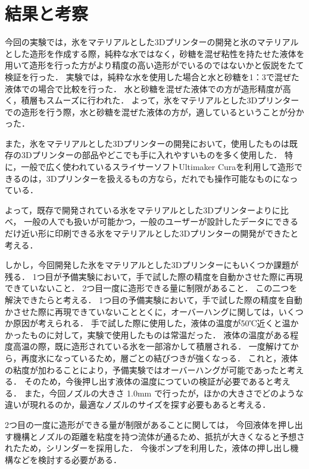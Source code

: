 \chapter{結果と考察}
\label{chp:first}

今回の実験では，氷をマテリアルとした3Dプリンターの開発と氷のマテリアルとした造形を作成する際，純粋な水ではなく，砂糖を混ぜ粘性を持たせた液体を用いて造形を行った方がより精度の高い造形がでいるのではないかと仮説をたて検証を行った．
実験では，純粋な水を使用した場合と水と砂糖を1：3で混ぜた液体での場合で比較を行った．
水と砂糖を混ぜた液体での方が造形精度が高く，積層もスムーズに行われた．
よって，氷をマテリアルとした3Dプリンターでの造形を行う際，水と砂糖を混ぜた液体の方が，適しているということが分かった．

また，氷をマテリアルとした3Dプリンターの開発において，使用したものは既存の3Dプリンターの部品やどこでも手に入れやすいものを多く使用した．
特に，一般で広く使われているスライサーソフトUltimaker Curaを利用して造形できるのは，3Dプリンターを扱えるもの方なら，だれでも操作可能なものになっている．

よって，既存で開発されている氷をマテリアルとした3Dプリンターよりに比べ，
一般の人でも扱いが可能かつ，一般のユーザーが設計したデータにできるだけ近い形に印刷できる氷をマテリアルとした3Dプリンターの開発ができたと考える．

しかし，今回開発した氷をマテリアルとした3Dプリンターにもいくつか課題が残る．
1つ目が予備実験において，手で試した際の精度を自動かさせた際に再現できていないこと．
2つ目一度に造形できる量に制限があること．
この二つを解決できたらと考える．
1つ目の予備実験において，手で試した際の精度を自動かさせた際に再現できていないこととくに，オーバーハングに関しては，いくつか原因が考えられる．
手で試した際に使用した，液体の温度が50℃近くと温かかったものに対して，実験で使用したものは常温だった．
液体の温度がある程度高温の際，既に造形されている氷を一部溶かして積層される．
一度解けてから，再度氷になっているため，層ごとの結びつきが強くなっる．
これと，液体の粘度が加わることにより，予備実験ではオーバーハングが可能であったと考える．
そのため，今後押し出す液体の温度につていの検証が必要であると考える．
また，今回ノズルの大きさ 1.0mm で行ったが，ほかの大きさでどのような違いが現れるのか，最適なノズルのサイズを探す必要もあると考える．

2つ目の一度に造形ができる量が制限があることに関しては，
今回液体を押し出す機構とノズルの距離を粘度を持つ流体が通るため、抵抗が大きくなると予想されたため，シリンダーを採用した．
今後ポンプを利用した，液体の押し出し機構などを検討する必要がある．



